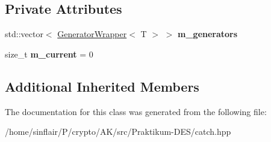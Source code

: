 \subsection*{Private Attributes}
\begin{DoxyCompactItemize}
\item 
\mbox{\label{classCatch_1_1Generators_1_1Generators_a4d41bb9f0e8d726a8a53c86354bf19de}} 
std\+::vector$<$ \hyperlink{classCatch_1_1Generators_1_1GeneratorWrapper}{Generator\+Wrapper}$<$ T $>$ $>$ {\bfseries m\+\_\+generators}
\item 
\mbox{\label{classCatch_1_1Generators_1_1Generators_a8f5cd6b2479cfadbd45033c4ad17ff0c}} 
size\+\_\+t {\bfseries m\+\_\+current} = 0
\end{DoxyCompactItemize}
\subsection*{Additional Inherited Members}


The documentation for this class was generated from the following file\+:\begin{DoxyCompactItemize}
\item 
/home/sinflair/\+P/crypto/\+A\+K/src/\+Praktikum-\/\+D\+E\+S/catch.\+hpp\end{DoxyCompactItemize}
